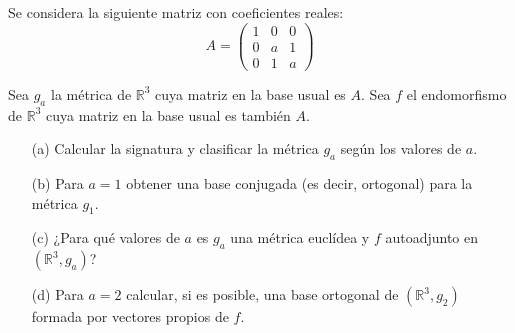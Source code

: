 \documentclass[12pt]{article}
\begin{document}
    \begin{ejercicio}[4 puntos]
    Se considera la siguiente matriz con coeficientes reales:
    \[
    A = \begin{pmatrix}
        1 & 0 & 0 \\
        0 & a & 1 \\
        0 & 1 & a
    \end{pmatrix}
    \]
    
    Sea $g_a$ la métrica de $\mathbb{R}^3$ cuya matriz en la base usual es $A$. Sea $f$ el endomorfismo de $\mathbb{R}^3$ cuya matriz en la base usual es también $A$.
    
    \begin{enumerate}
        \item[(a)] Calcular la signatura y clasificar la métrica $g_a$ según los valores de $a$.
        \item[(b)] Para $a = 1$ obtener una base conjugada (es decir, ortogonal) para la métrica $g_1$.
        \item[(c)] ¿Para qué valores de $a$ es $g_a$ una métrica euclídea y $f$ autoadjunto en $(\mathbb{R}^3, g_a)$?
        \item[(d)] Para $a = 2$ calcular, si es posible, una base ortogonal de $(\mathbb{R}^3, g_2)$ formada por vectores propios de $f$.
    \end{enumerate}
    \end{ejercicio}
    
    \newpage
    \setcounter{ejercicio}{0}
	
\end{document}

